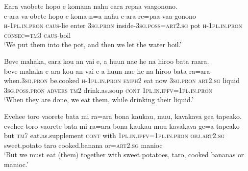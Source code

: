 \ea\label{ex:text32-21}
Eara vaobete hopo e komana nahu eara repaa vaagonono.\\
\gll e-ara	va-obete	hopo	e	koma-n=a	nahu	e-ara	re=paa	vaa-gonono\\
     \textsc{h}-1\textsc{pl}.\textsc{in}.\textsc{pron}	\textsc{caus}-lie	enter	3\textsc{sg}.\textsc{pron}	inside-3\textsc{sg}.\textsc{poss}=\textsc{art}2.\textsc{sg}	pot	\textsc{h}-1\textsc{pl}.\textsc{in}.\textsc{pron}	\textsc{consec}=\textsc{tm}3	\textsc{caus}-boil\\
\glt `We put them into the pot, and then we let the water boil.'
\z

\ea\label{ex:text32-22}
Beve mahaka, eara kou an vai e, a huun nae he na hiroo bata raara.\\
\gll beve	mahaka	e-ara	kou	an	vai	e	a	huun	nae	he	na	hiroo	bata	ra=ara\\
     when.3\textsc{sg}.\textsc{pron}	be.cooked	\textsc{h}-1\textsc{pl}.\textsc{in}.\textsc{pron}	\textsc{emph}2	eat	now	3\textsc{sg}.\textsc{pron}	\textsc{art}2.\textsc{sg}	liquid	3\textsc{sg}.\textsc{poss}.\textsc{pron}	\textsc{advers}	\textsc{tm}2	drink.as.soup	\textsc{cont}	1\textsc{pl}.\textsc{in}.\textsc{ipfv}=1\textsc{pl}.\textsc{in}.\textsc{pron}\\
\glt `When they are done, we eat them, while drinking their liquid.'
\z

\ea\label{ex:text32-23}
Evehee toro vaorete bata mi ra=ara bona kaukau, muu, kavakava gea tapeako.\\
\gll evehee	toro	vaorete	bata	mi	ra=ara	bona	kaukau	muu	kavakava	ge=a	tapeako\\
     but	\textsc{tm}7	eat.as.supplement	\textsc{cont}	with	1\textsc{pl}.\textsc{in}.\textsc{ipfv}=1\textsc{pl}.\textsc{in}.\textsc{pron}	\textsc{obj}.\textsc{art}2.\textsc{sg}	sweet.potato	taro	cooked.banana	or=\textsc{art}2.\textsc{sg}	manioc\\
\glt `But we must eat (them) together with sweet potatoes, taro, cooked bananas or manioc.'
\z
